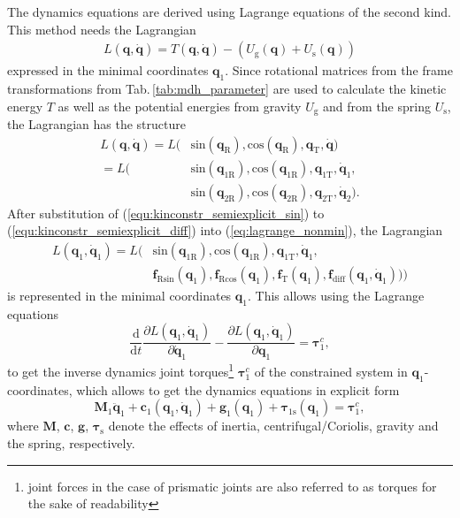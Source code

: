 \documentclass[letterpaper, 10 pt, conference]{ieeeconf}  %
\newcommand{\bm}[1]{\boldsymbol{#1}}
\begin{document}
The dynamics equations are derived using Lagrange equations of the second kind. This method needs the Lagrangian 
%
\begin{align}
L(\bm{q},\dot{\bm{q}}) = T(\bm{q},\dot{\bm{q}})-(U_\mathrm{g}(\bm{q})+U_\mathrm{s}(\bm{q}))
\label{equ:Lagrange_energy}
\end{align}
%
expressed in the minimal coordinates $\bm{q}_1$. Since rotational matrices from the frame transformations from Tab.\,\ref{tab:mdh_parameter} are used to calculate the kinetic energy $T$ as well as the potential energies from gravity $U_\mathrm{g}$ and from the spring $U_\mathrm{s}$, the Lagrangian has the structure
%
\begin{align}
L(\bm{q},\dot{\bm{q}}) =L( & \mathrm{sin}  (\bm{q}_{\mathrm{R}}),\mathrm{cos}(\bm{q}_{\mathrm{R}}), \bm{q}_{\mathrm{T}},\dot{\bm{q}}) \\\label{eq:lagrange_nonmin}
=L( & \mathrm{sin}  (\bm{q}_{1\mathrm{R}}),\mathrm{cos}(\bm{q}_{1\mathrm{R}}), \bm{q}_{1\mathrm{T}},\dot{\bm{q}}_{1}, \nonumber \\
& \mathrm{sin}  (\bm{q}_{2\mathrm{R}}),\mathrm{cos}(\bm{q}_{2\mathrm{R}}), \bm{q}_{2\mathrm{T}},\dot{\bm{q}}_{2}).
\end{align}
%
After substitution of (\ref{equ:kinconstr_semiexplicit_sin}) to (\ref{equ:kinconstr_semiexplicit_diff}) into (\ref{eq:lagrange_nonmin}), the Lagrangian 
%
\begin{align}
L(\bm{q}_1,\dot{\bm{q}}_1)=L( & \mathrm{sin} (\bm{q}_{1\mathrm{R}}),\mathrm{cos}(\bm{q}_{1\mathrm{R}}), \bm{q}_{1\mathrm{T}},\dot{\bm{q}}_{1}, \\
 & \bm{f}_{\mathrm{R}\mathrm{sin}}(\bm{q}_1),
\bm{f}_{\mathrm{R}\mathrm{cos}}(\bm{q}_1),
\bm{f}_{\mathrm{T}}(\bm{q}_1),
\bm{f}_\mathrm{diff}(\bm{q}_1,\dot{\bm{q}}_1))) \nonumber
\end{align}
%
is represented in the minimal coordinates $\bm{q}_1$.
This allows using the Lagrange equations
%
\begin{equation}
\frac{\mathrm{d}}{\mathrm{d}t}\frac{\partial L(\bm{q}_1,\dot{\bm{q}}_1)}{\partial \dot{\bm{q}}_1} - \frac{\partial L(\bm{q}_1,\dot{\bm{q}}_1)}{\partial \bm{q}_1}= \bm{\tau}^c_1,
\end{equation}
%
to get the inverse dynamics joint torques\footnote{joint forces in the case of prismatic joints are also referred to as torques for the sake of readability} $\bm{\tau}^c_1$ of the constrained system in $\bm{q}_1$-coordinates, which allows to get the dynamics equations in explicit form
%
\begin{equation}
\bm{M}_1\ddot{\bm{q}}_1+\bm{c}_1(\bm{q}_1,\dot{\bm{q}}_1)+\bm{g}_1(\bm{q}_1) + \bm{\tau}_{1\mathrm{s}}(\bm{q}_1) = \bm{\tau}^c_1,
\label{equ:Dyn_MinKoord}
\end{equation}
%
where $\bm{M}$, $\bm{c}$, $\bm{g}$, $\bm{\tau}_{\mathrm{s}}$ denote the effects of inertia, centrifugal/Coriolis, gravity and the spring, respectively.
\end{document}

